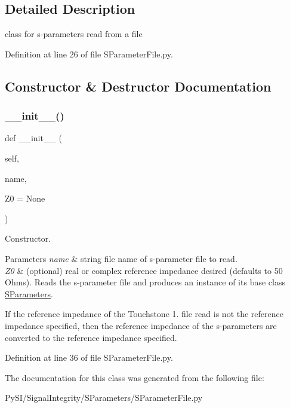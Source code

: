 \subsection{Detailed Description}
class for s-\/parameters read from a file 

Definition at line 26 of file S\+Parameter\+File.\+py.



\subsection{Constructor \& Destructor Documentation}
\mbox{\label{classSignalIntegrity_1_1SParameters_1_1SParameterFile_1_1SParameterFile_ac64ec849ddf7924828e6292d81a6c5d0}} 
\subsubsection{\texorpdfstring{\+\_\+\+\_\+init\+\_\+\+\_\+()}{\_\_init\_\_()}}
{\footnotesize\ttfamily def \+\_\+\+\_\+init\+\_\+\+\_\+ (\begin{DoxyParamCaption}\item[{}]{self,  }\item[{}]{name,  }\item[{}]{Z0 = {\ttfamily None} }\end{DoxyParamCaption})}



Constructor. 


\begin{DoxyParams}{Parameters}
{\em name} & string file name of s-\/parameter file to read. \\
\hline
{\em Z0} & (optional) real or complex reference impedance desired (defaults to 50 Ohms). Reads the s-\/parameter file and produces an instance of its base class \hyperlink{namespaceSignalIntegrity_1_1SParameters_1_1SParameters}{S\+Parameters}.\\
\hline
\end{DoxyParams}
If the reference impedance of the Touchstone 1. file read is not the reference impedance specified, then the reference impedance of the s-\/parameters are converted to the reference impedance specified. 

Definition at line 36 of file S\+Parameter\+File.\+py.



The documentation for this class was generated from the following file\+:\begin{DoxyCompactItemize}
\item 
Py\+S\+I/\+Signal\+Integrity/\+S\+Parameters/S\+Parameter\+File.\+py\end{DoxyCompactItemize}
